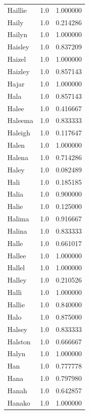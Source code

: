 \documentclass[
  letterpaper,
  DIV=11,
  numbers=noendperiod]{scrreprt}
\begin{document}
\begin{tabular}{lrr}
Haillie         &   1.0 &   1.000000 \\
Haily           &   1.0 &   0.214286 \\
Hailyn          &   1.0 &   1.000000 \\
Haisley         &   1.0 &   0.837209 \\
Haizel          &   1.0 &   1.000000 \\
Haizley         &   1.0 &   0.857143 \\
Hajar           &   1.0 &   1.000000 \\
Hala            &   1.0 &   0.857143 \\
Halee           &   1.0 &   0.416667 \\
Haleema         &   1.0 &   0.833333 \\
Haleigh         &   1.0 &   0.117647 \\
Halen           &   1.0 &   1.000000 \\
Halena          &   1.0 &   0.714286 \\
Haley           &   1.0 &   0.082489 \\
Hali            &   1.0 &   0.185185 \\
Halia           &   1.0 &   0.900000 \\
Halie           &   1.0 &   0.125000 \\
Halima          &   1.0 &   0.916667 \\
Halina          &   1.0 &   0.833333 \\
Halle           &   1.0 &   0.661017 \\
Hallee          &   1.0 &   1.000000 \\
Hallel          &   1.0 &   1.000000 \\
Halley          &   1.0 &   0.210526 \\
Halli           &   1.0 &   1.000000 \\
Hallie          &   1.0 &   0.840000 \\
Halo            &   1.0 &   0.875000 \\
Halsey          &   1.0 &   0.833333 \\
Halston         &   1.0 &   0.666667 \\
Halyn           &   1.0 &   1.000000 \\
Han             &   1.0 &   0.777778 \\
Hana            &   1.0 &   0.797980 \\
Hanah           &   1.0 &   0.642857 \\
Hanako          &   1.0 &   1.000000 \\

\end{tabular}
\end{document}
